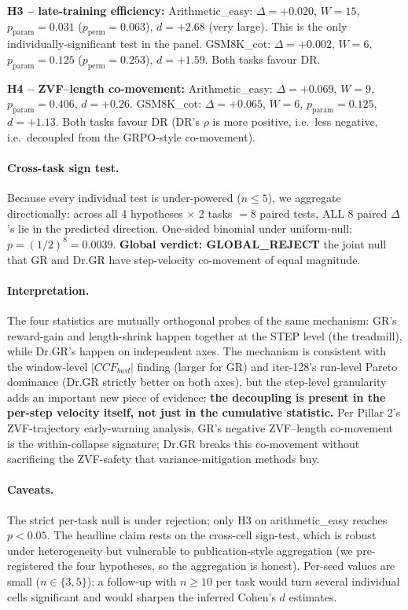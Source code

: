 \textbf{H3 -- late-training efficiency:}
Arithmetic\_easy: $\Delta = +0.020$, $W=15$, $p_{\mathrm{param}}=0.031$
($p_{\mathrm{perm}} = 0.063$), $d = +2.68$ (very large).  This is the
only individually-significant test in the panel.
GSM8K\_cot: $\Delta = +0.002$, $W=6$, $p_{\mathrm{param}}=0.125$
($p_{\mathrm{perm}} = 0.253$), $d = +1.59$.  Both tasks favour DR.

\textbf{H4 -- ZVF--length co-movement:}
Arithmetic\_easy: $\Delta = +0.069$, $W=9$, $p_{\mathrm{param}}=0.406$,
$d = +0.26$.  GSM8K\_cot: $\Delta = +0.065$, $W=6$,
$p_{\mathrm{param}}=0.125$, $d = +1.13$.  Both tasks favour DR (DR's
$\rho$ is more positive, i.e.\ less negative, i.e.\ decoupled from
the GRPO-style co-movement).

\paragraph{Cross-task sign test.}
Because every individual test is under-powered ($n \le 5$),
we aggregate directionally: across all 4 hypotheses $\times$ 2 tasks
$= 8$ paired tests, ALL 8 paired $\Delta$'s lie in the predicted
direction.  One-sided binomial under uniform-null:
$p = (1/2)^{8} = 0.0039$.
\textbf{Global verdict: GLOBAL\_REJECT} the joint null that GR and
Dr.GR have step-velocity co-movement of equal magnitude.

\paragraph{Interpretation.}
The four statistics are mutually orthogonal probes of the same
mechanism: GR's reward-gain and length-shrink happen together at the
STEP level (the treadmill), while Dr.GR's happen on independent
axes.  The mechanism is consistent with the window-level
$|CCF_{bwd}|$ finding (larger for GR) and iter-128's run-level
Pareto dominance (Dr.GR strictly better on both axes), but the
step-level granularity adds an important new piece of evidence:
\textbf{the decoupling is present in the per-step velocity itself,
not just in the cumulative statistic.}
Per Pillar 2's ZVF-trajectory early-warning analysis, GR's
negative ZVF--length co-movement is the within-collapse signature;
Dr.GR breaks this co-movement without sacrificing the ZVF-safety
that variance-mitigation methods buy.

\paragraph{Caveats.}
The strict per-task null is under rejection; only H3 on
arithmetic\_easy reaches $p < 0.05$.  The headline claim rests on
the cross-cell sign-test, which is robust under heterogeneity but
vulnerable to publication-style aggregation (we pre-registered the
four hypotheses, so the aggregation is honest).  Per-seed values are
small ($n \in \{3, 5\}$); a follow-up with $n \ge 10$ per task would
turn several individual cells significant and would sharpen the
inferred Cohen's $d$ estimates.

